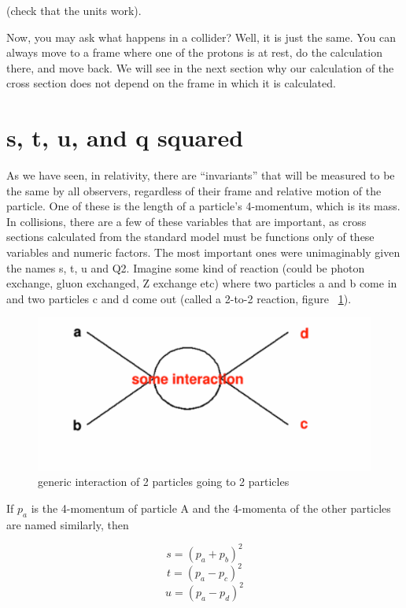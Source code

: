 (check that the units work).

Now, you may ask what happens in a collider?  Well, it is just the same.  You can always move to a frame where one of the protons is at rest, do the calculation there, and move back.  We will see in the next section why our calculation of the cross section does not depend on the frame in which it is calculated.

\section{s, t, u, and q squared}

As we have seen, in relativity, there are ``invariants'' that will be 
measured to be the same by all observers, regardless of 
their frame and relative motion of the particle.  One of these is the length of a particle's 
4-momentum, which is its mass.  In collisions, there are a few of these variables that are important, as cross sections calculated from the standard model must be functions only of these variables and numeric factors.  The most important ones were unimaginably given the names s, t, u and Q2.  Imagine some kind of reaction (could be photon exchange, gluon exchanged, Z exchange etc) where two particles a and b come in and two particles c and d come out  (called a 2-to-2 reaction, figure ~\ref{fig:twototwo}).

\begin{figure}[h]
\centering\includegraphics[scale=0.5]{./protonprotoncollisions/Pictures/fig1.pdf}
\caption{generic interaction of 2 particles going to 2 particles}
\label{fig:twototwo}
\end{figure}

If \(p_{a}\) is the 4-momentum of particle A and the 4-momenta of the other particles are named similarly, then

\begin{equation}s=(p_{a}+p_{b})^{2}\end{equation}
\begin{equation}t=(p_{a}-p_{c})^{2}\end{equation}
\begin{equation}u=(p_{a}-p_{d})^{2}\end{equation}

